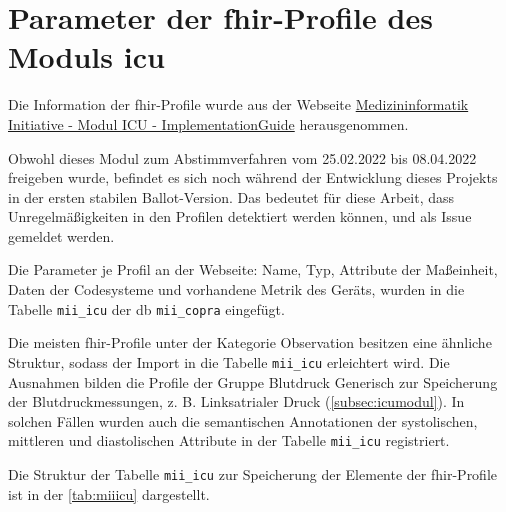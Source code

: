 \section{Parameter der \acs{fhir}-Profile des Moduls \glqq\acs{icu}\grqq{}} \label{sec:fhirprofs}

Die Information der \ac{fhir}-Profile wurde aus der Webseite \href{https://www.medizininformatik-initiative.de/Kerndatensatz/Modul_Intensivmedizin/IGMIIKDSModulICU.html}{Medizininformatik Initiative - Modul ICU - ImplementationGuide} herausgenommen. 

Obwohl dieses Modul zum Abstimmverfahren vom 25.02.2022 bis 08.04.2022 freigeben wurde, befindet es sich noch während der Entwicklung dieses Projekts in der ersten stabilen Ballot-Version. Das bedeutet für diese Arbeit, dass Unregelmäßigkeiten in den Profilen detektiert werden können, und als Issue gemeldet werden.

Die Parameter je Profil an der Webseite: Name, Typ, Attribute der Maßeinheit, Daten der Codesysteme und vorhandene Metrik des Geräts, wurden in die Tabelle \texttt{mii\_icu} der \ac{db} \texttt{mii\_copra} eingefügt.

Die meisten \ac{fhir}-Profile unter der Kategorie \glqq Observation\grqq{} besitzen eine ähnliche Struktur, sodass der Import in die Tabelle \texttt{mii\_icu} erleichtert wird. Die Ausnahmen bilden die Profile der Gruppe \glqq Blutdruck Generisch\grqq{} zur Speicherung der Blutdruckmessungen, z. B. \glqq Linksatrialer Druck\grqq{} (\ref{subsec:icumodul}). In solchen Fällen wurden auch die semantischen Annotationen der systolischen, mittleren und diastolischen Attribute in der Tabelle \texttt{mii\_icu} registriert.

\newpage

Die Struktur der Tabelle \texttt{mii\_icu} zur Speicherung der Elemente der \ac{fhir}-Profile ist in der \ref{tab:miiicu} dargestellt.

